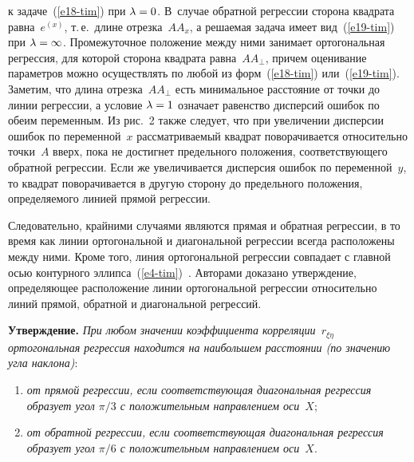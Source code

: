 \begin{multicols}{2}

\vspace*{15pt}

\addtocounter{figure}{1}

\noindent
 к задаче~(\ref{e18-tim}) при
$\lambda\hm=0$. В~случае обратной регрессии
 сторона квадрата
равна~$e^{(x)}$, т.\,е.\ длине отрезка~$AA_x$,
а решаемая задача имеет
вид~(\ref{e19-tim}) при $\lambda \hm =\infty$. Промежуточное положение
между ними занимает ортогональная регрессия, для которой сторона
квадрата равна~$AA_{\perp}$, причем оценивание параметров можно
осуществлять по любой из форм~(\ref{e18-tim}) или~(\ref{e19-tim}). Заметим,
что длина отрезка~$AA_{\perp}$ есть минимальное расстояние от точки до
линии регрессии, а условие $\lambda\hm=1$ означает равенство дисперсий
ошибок по обеим переменным. Из рис.~2 также следует, что при увеличении
дисперсии ошибок по переменной~$x$ рассматриваемый квадрат
поворачивается относительно точки~$A$ вверх, пока не достигнет
предельного положения, соответствующего обратной регрессии. Если же
увеличивается дисперсия ошибок по переменной~$y$, то квадрат
поворачивается в другую сторону до предельного положения,
определяемого линией прямой регрессии.

 

  Следовательно, крайними случаями являются прямая и обратная
регрессии, в то время как линии ортогональной и диагональной регрессии
всегда расположены между ними. Кроме того, линия ортогональной
регрессии совпадает с главной осью контурного эллипса~(\ref{e4-tim})~\cite{6-tim, 7-tim}. Авторами доказано утверждение, определяющее
расположение линии ортогональной регрессии относительно линий прямой,
обратной и диагональной регрессий.

  \smallskip

  \noindent
  \textbf{Утверждение.} \textit{При любом значении коэффициента
корреляции~$r_{\xi\eta}$ ортогональная регрессия находится на наибольшем
расстоянии (по значению угла наклона)}:
\begin{enumerate}[(1)]
\item \textit{от прямой регрессии, если соответствующая диагональная
регрессия образует угол $\pi/3$ с положительным направлением оси~$X$};
\item \textit{от обратной регрессии, если соответствующая диагональная
регрессия образует угол $\pi/6$ с положительным направлением оси~$X$}.
\end{enumerate}

\smallskip


\end{multicols}
